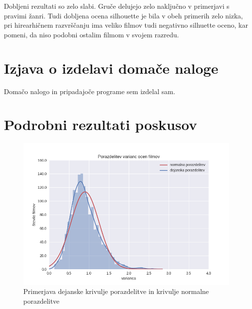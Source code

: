 \documentclass[a4paper,11pt]{article}
\begin{document}
Dobljeni rezultati so zelo slabi. Gruče delujejo zelo naključno v primerjavi s pravimi žanri. Tudi dobljena ocena silhouette je bila v obeh primerih zelo nizka, pri hirearhičnem razvrščanju ima veliko filmov tudi negativno silhuette oceno, kar pomeni, da niso podobni ostalim filmom v svojem razredu.

\section{Izjava o izdelavi domače naloge}
Domačo nalogo in pripadajoče programe sem izdelal sam.

\appendix
\appendixpage
\section{\label{app-res}Podrobni rezultati poskusov}


\begin{figure}[htbp]
\begin{center}
\includegraphics[scale=0.7]{porazdelitevNormalna.png}
\caption{Primerjava dejanske krivulje porazdelitve in krivulje normalne porazdelitve}
\label{slika3}
\end{center}
\end{figure}
\end{document}
